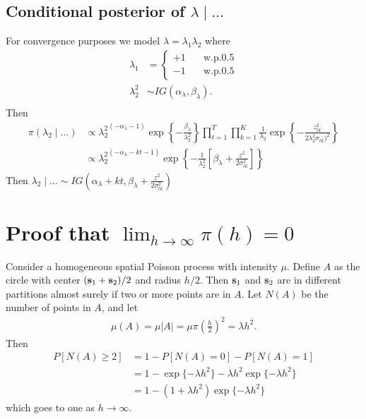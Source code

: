 \documentclass[useAMS,usenatbib,referee]{biomweb}
\begin{document}
\subsection*{Conditional posterior of $\lambda \mid \ldots$}\label{s:lambdapost}
For convergence purposes we model $\lambda = \lambda_1 \lambda_2$ where
\begin{align}
  \lambda_1 &= \left\{ \begin{array}{ll}
      +1 \quad & \text{w.p.} 0.5\\
      -1 \quad & \text{w.p.} 0.5
   \end{array}\right.\\
   \lambda^2_2 & \sim IG(\alpha_\lambda, \beta_\lambda).\\
\end{align}
Then
\begin{align*}
  \pi(\lambda_2 \mid \ldots) &\propto {\lambda_2^2}^{(-\alpha_\lambda - 1)} \exp\left\{ - \frac{ \beta_\lambda }{ \lambda_2^2} \right\} \prod_{t = 1}^{T} \prod_{k = 1}^K \frac{1} {\lambda_2} \exp\left\{ - \frac{ z^2_{tk} }{ 2 \lambda_2^2  \sigma_{tk})^2} \right\} \\
   & \propto {\lambda_2^2}^{(-\alpha_\lambda - kt - 1)} \exp \left\{ -\frac{1}{\lambda^2_2} \left[ \beta_\lambda + \frac{ z^2 }{2 \sigma^2_{tk}} \right] \right\}
\end{align*}
Then $\lambda_2 \mid \ldots \sim IG \left(\alpha_\lambda + kt, \beta_\lambda + \frac{ z^2 }{2 \sigma^2_{tk}} \right)$

\section{Proof that $\lim_{h \rightarrow \infty} \pi(h) = 0$} \label{a:proofsamepartition}
Consider a homogeneous spatial Poisson process with intensity $\mu$.
Define $A$ as the circle with center \hbox{$(\mbox{\bf s}_1 + \mbox{\bf s}_2) / 2$} and radius $h / 2$.
Then $\mbox{\bf s}_1$ and $\mbox{\bf s}_2$ are in different partitions almost surely if two or more points are in $A$.
Let $N(A)$ be the number of points in $A$, and let
\begin{align*}
  \mu(A) = \mu |A| = \mu \pi \left(\frac{h}{2}\right)^2 = \lambda h^2.
\end{align*}
Then
\begin{align*}
  P[N(A) \ge 2] &= 1 - P[N(A) = 0] - P[N(A) = 1]\\
                &= 1 - \exp\{-\lambda h^2\} - \lambda h^2 \exp\{-\lambda h^2\} \\
                &= 1 - (1 + \lambda h^2) \exp\{-\lambda h^2\}
\end{align*}
which goes to one as $h \rightarrow \infty$.
\end{document}
